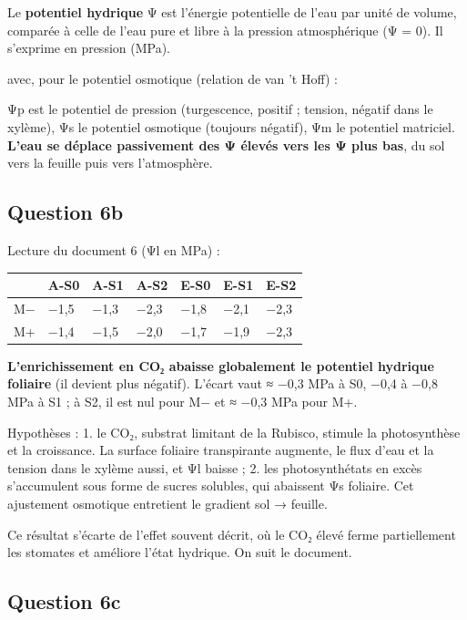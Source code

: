 \documentclass[11pt,a4paper]{article}
\newcommand{\equationajustee}[1]{%
  \sbox{\boiteequation}{$\displaystyle #1$}%
  \ifdim\wd\boiteequation>\linewidth
    \[\resizebox{\linewidth}{!}{\usebox{\boiteequation}}\]%
  \else
    \[#1\]%
  \fi}
\begin{document}
Le \textbf{potentiel hydrique} Ψ est l'énergie potentielle de l'eau par unité de volume, comparée à celle de l'eau pure et libre à la pression atmosphérique (Ψ = 0). Il s'exprime en pression (MPa).

\equationajustee{\Psi=\Psi_p+\Psi_s\ (+\Psi_m)}

avec, pour le potentiel osmotique (relation de van 't Hoff) :

\equationajustee{\Psi_s=-RT\sum_i c_i}

Ψp est le potentiel de pression (turgescence, positif ; tension, négatif dans le xylème), Ψs le potentiel osmotique (toujours négatif), Ψm le potentiel matriciel. \textbf{L'eau se déplace passivement des Ψ élevés vers les Ψ plus bas}, du sol vers la feuille puis vers l'atmosphère.

\hypertarget{question-6b}{%
\subsection{Question 6b}\label{question-6b}}

Lecture du document 6 (Ψl en MPa) :

\begin{longtable}[]{@{}lllllll@{}}
\toprule\noalign{}
& A-S0 & A-S1 & A-S2 & E-S0 & E-S1 & E-S2 \\
\midrule\noalign{}
\endhead
\bottomrule\noalign{}
\endlastfoot
M− & −1,5 & −1,3 & −2,3 & −1,8 & −2,1 & −2,3 \\
M+ & −1,4 & −1,5 & −2,0 & −1,7 & −1,9 & −2,3 \\
\end{longtable}

\textbf{L'enrichissement en CO₂ abaisse globalement le potentiel hydrique foliaire} (il devient plus négatif). L'écart vaut ≈ −0,3 MPa à S0, −0,4 à −0,8 MPa à S1 ; à S2, il est nul pour M− et ≈ −0,3 MPa pour M+.

Hypothèses :
1. le CO₂, substrat limitant de la Rubisco, stimule la photosynthèse et la croissance. La surface foliaire transpirante augmente, le flux d'eau et la tension dans le xylème aussi, et Ψl baisse ;
2. les photosynthétats en excès s'accumulent sous forme de sucres solubles, qui abaissent Ψs foliaire. Cet ajustement osmotique entretient le gradient sol → feuille.

Ce résultat s'écarte de l'effet souvent décrit, où le CO₂ élevé ferme partiellement les stomates et améliore l'état hydrique. On suit le document.

\hypertarget{question-6c}{%
\subsection{Question 6c}\label{question-6c}}
\end{document}
